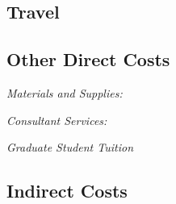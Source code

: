 \subsection*{Travel}

\subsection*{Other Direct Costs}

 \emph{Materials and Supplies:}

\emph{Consultant Services:}

\emph{Graduate Student Tuition}

\subsection*{Indirect Costs}


